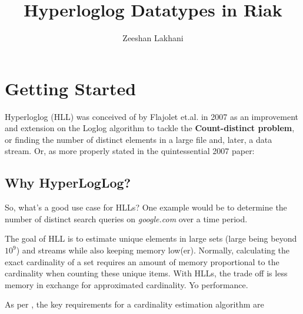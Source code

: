 \documentclass[12pt]{article}
\newlength\tindent
\renewcommand{\indent}{\hspace*{\tindent}}
\begin{document}
\title{Hyperloglog Datatypes in Riak}
\author{Zeeshan Lakhani}

\maketitle

\section{Getting Started}

Hyperloglog (HLL) was conceived of by
Flajolet et.al.\cite{Flatjolet:2007:Online} in 2007 as an improvement and
extension on the Loglog\cite{Durand:2003:Online} algorithm to tackle the
\textbf{Count-distinct problem}\cite{Count-distinct:Online}, or finding the
number of distinct elements in a large file and, later, a data stream.
Or, as more properly stated in the quintessential 2007 paper:\newline


\subsection{Why HyperLogLog?}

So, what's a good use case for HLLs? One example would be to determine the
number of distinct search queries on \textit{google.com} over a time
period\cite{Heule:2013:Online}.

\indent The goal of HLL is to estimate unique elements in large sets (large being beyond
$10^{9}$) and streams while also keeping memory low(er). Normally, calculating
the exact cardinality of a set requires an amount of memory proportional to the
cardinality when counting these unique items. With HLLs, the trade off is less
memory in exchange for approximated cardinality. Yo performance.\newline

As per \cite{Heule:2013:Online}, the key requirements for a cardinality
estimation algorithm are
\end{document}
